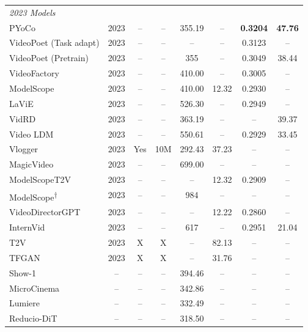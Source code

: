 \begin{longtable}{lccccccc}
    \multicolumn{8}{l}{\textit{2023 Models}} \\
    PYoCo \cite{blattmann2023pyoco} & 2023 & -- & -- & 355.19 & -- & \textbf{0.3204} & \textbf{47.76} \\
    VideoPoet (Task adapt) \cite{guo2023videopoet} & 2023 & -- & -- & -- & -- & 0.3123 & -- \\
    VideoPoet (Pretrain) \cite{guo2023videopoet} & 2023 & -- & -- & 355 & -- & 0.3049 & 38.44 \\
    VideoFactory \cite{wang2023videofactory} & 2023 & -- & -- & 410.00 & -- & 0.3005 & -- \\
    ModelScope \cite{chen2023modelscope} & 2023 & -- & -- & 410.00 & 12.32 & 0.2930 & -- \\
    LaViE \cite{ma2023lavie} & 2023 & -- & -- & 526.30 & -- & 0.2949 & -- \\
    VidRD \cite{hu2023vidrd} & 2023 & -- & -- & 363.19 & -- & -- & 39.37 \\
    Video LDM \cite{blattmann2023videoldm} & 2023 & -- & -- & 550.61 & -- & 0.2929 & 33.45 \\
    Vlogger \cite{li2023vlogger} & 2023 & Yes & 10M & 292.43 & 37.23 & -- & -- \\
    MagicVideo \cite{zhao2023magicvideo} & 2023 & -- & -- & 699.00 & -- & -- & -- \\
    ModelScopeT2V \cite{chen2023modelscope} & 2023 & -- & -- & -- & 12.32 & 0.2909 & -- \\
    ModelScope\textsuperscript{†} \cite{chen2023modelscope} & 2023 & -- & -- & 984 & -- & -- & -- \\
    VideoDirectorGPT \cite{chen2023videodirectorgpt} & 2023 & -- & -- & -- & 12.22 & 0.2860 & -- \\
    InternVid \cite{wang2023internvid} & 2023 & -- & -- & 617 & -- & 0.2951 & 21.04 \\
    T2V \cite{chen2023t2v} & 2023 & X & X & -- & 82.13 & -- & -- \\
    TFGAN \cite{chen2023tfgan} & 2023 & X & X & -- & 31.76 & -- & -- \\
    Show-1 \cite{show1} & -- & -- & -- & 394.46 & -- & -- & -- \\
    MicroCinema \cite{microcinema} & -- & -- & -- & 342.86 & -- & -- & -- \\
    Lumiere \cite{lumiere} & -- & -- & -- & 332.49 & -- & -- & -- \\
    Reducio-DiT & -- & -- & -- & 318.50 & -- & -- & -- \\
    \end{longtable}
    
